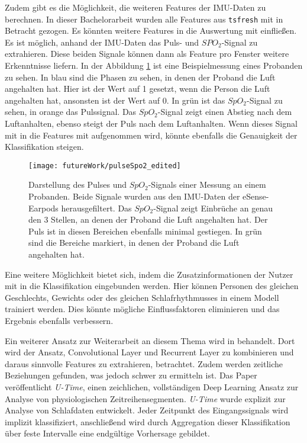 Zudem gibt es die Möglichkeit, die weiteren Features der IMU-Daten zu berechnen.
In dieser Bachelorarbeit wurden alle Features aus \texttt{tsfresh} mit in Betracht gezogen. 
Es könnten weitere Features in die Auswertung mit einfließen.
Es ist möglich, anhand der IMU-Daten das Puls- und $SPO_2$-Signal zu extrahieren. 
Diese beiden Signale können dann als Feature pro Fenster weitere Erkenntnisse liefern.
In der Abbildung \ref{futureWork:pulseSpo2} ist eine Beispielmessung eines Probanden zu sehen. 
In blau sind die Phasen zu sehen, in denen der Proband die Luft angehalten hat.
Hier ist der Wert auf 1 gesetzt, wenn die Person die Luft angehalten hat, ansonsten ist der Wert auf 0. 
In grün ist das $SpO_2$-Signal zu sehen, in orange das Pulssignal. 
Das $SpO_2$-Signal zeigt einen Abstieg nach dem Luftanhalten, ebenso steigt der Puls nach dem Luftanhalten.
Wenn dieses Signal mit in die Features mit aufgenommen wird, könnte ebenfalls die Genauigkeit der Klassifikation steigen. 
\begin{figure}[ht]
    \centering
    \texttt{[image: futureWork/pulseSpo2\_edited]}
    \caption{Darstellung des Pulses und $SpO_2$-Signals einer Messung an einem Probanden. Beide Signale wurden aus den IMU-Daten der eSense-Earpods herausgefiltert. Das $SpO_2$-Signal zeigt Einbrüche an genau den 3 Stellen, an denen der Proband die Luft angehalten hat. Der Puls ist in diesen Bereichen ebenfalls minimal gestiegen. In grün sind die Bereiche markiert, in denen der Proband die Luft angehalten hat.}
    \label{futureWork:pulseSpo2}
\end{figure}

Eine weitere Möglichkeit bietet sich, indem die Zusatzinformationen der Nutzer mit in die Klassifikation eingebunden werden.
Hier können Personen des gleichen Geschlechts, Gewichts oder des gleichen Schlafrhythmusses in einem Modell trainiert werden.
Dies könnte mögliche Einflussfaktoren eliminieren und das Ergebnis ebenfalls verbessern.

Ein weiterer Ansatz zur Weiterarbeit an diesem Thema wird in \cite{perslevUTimeFullyConvolutional2019} behandelt.
Dort wird der Ansatz, Convolutional Layer und Recurrent Layer zu kombinieren und daraus sinnvolle Features zu extrahieren, betrachtet. 
Zudem werden zeitliche Beziehungen gefunden, was jedoch schwer zu ermitteln ist. 
Das Paper veröffentlicht \textit{U-Time}, einen zeichlichen, vollständigen Deep Learning Ansatz zur Analyse von physiologischen Zeitreihensegmenten. 
\textit{U-Time} wurde explizit zur Analyse von Schlafdaten entwickelt.
Jeder Zeitpunkt des Eingangssignals wird implizit klassifiziert, anschließend wird durch Aggregation dieser Klassifikation über feste Intervalle eine endgültige Vorhersage gebildet.